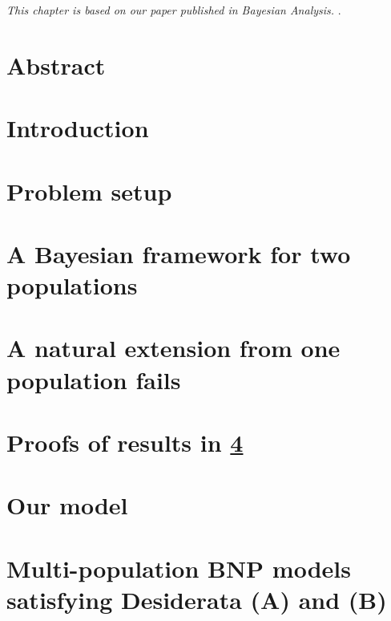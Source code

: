 
%


\textit{This chapter is based on our paper published in Bayesian Analysis.} \citep{shen2025double}. 

\section*{Abstract}


\section{Introduction}
\label{sec:introduction}


\section{Problem setup}
\label{sec:setup}


\section{A Bayesian framework for two populations}
\label{sec:bnp_two_pops}


\section{A natural extension from one population fails}
\label{sec:cant_have_it_all}


\section{Proofs of results in \cref{sec:cant_have_it_all}}
\label{sec:product_measure}


\section{Our model}
\label{sec:our_model} %
 

\section{Multi-population BNP models satisfying Desiderata (A) and (B)}
\label{sec:proper_proof}


